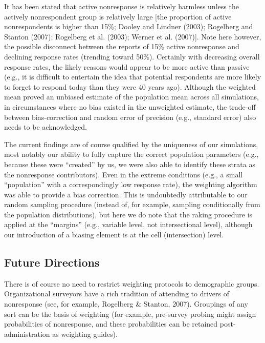 \documentclass[
  man,mask]{apa7}
\begin{document}
It has been stated that active nonresponse is relatively harmless unless the actively nonrespondent group is relatively large {[}the proportion of active nonrespondents is higher than 15\%; Dooley and Lindner (2003); Rogelberg and Stanton (2007); Rogelberg et al. (2003); Werner et al. (2007){]}. Note here however, the possible disconnect between the reports of 15\% active nonresponse and declining response rates (trending toward 50\%). Certainly with decreasing overall response rates, the likely reasons would appear to be more active than passive (e.g., it is difficult to entertain the idea that potential respondents are more likely to forget to respond today than they were 40 years ago). Although the weighted mean proved an unbiased estimate of the population mean across all simulations, in circumstances where no bias existed in the unweighted estimate, the trade-off between bias-correction and random error of precision (e.g., standard error) also needs to be acknowledged.

The current findings are of course qualified by the uniqueness of our simulations, most notably our ability to fully capture the correct population parameters (e.g., because these were ``created'' by us, we were also able to identify these strata as the nonresponse contributors). Even in the extreme conditions (e.g., a small ``population'' with a correspondingly low response rate), the weighting algorithm was able to provide a bias correction. This is undoubtedly attributable to our random sampling procedure (instead of, for example, sampling conditionally from the population distributions), but here we do note that the raking procedure is applied at the ``margins'' (e.g., variable level, not intersectional level), although our introduction of a biasing element is at the cell (intersection) level.

\subsection{Future Directions}\label{future-directions}

There is of course no need to restrict weighting protocols to demographic groups. Organizational surveyors have a rich tradition of attending to drivers of nonresponse (see, for example, Rogelberg \& Stanton, 2007). Groupings of any sort can be the basis of weighting (for example, pre-survey probing might assign probabilities of nonresponse, and these probabilities can be retained post-administration as weighting guides).
\end{document}
